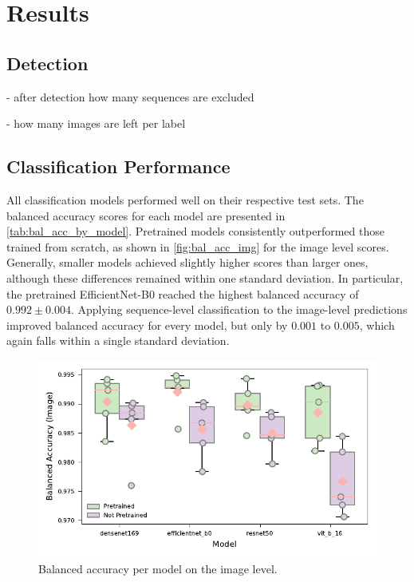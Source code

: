 

\section{Results}
\label{results}

    \subsection{Detection}

    - after detection how many sequences are excluded

    - how many images are left per label

    \subsection{Classification Performance}

    All classification models performed well on their respective test sets.
    The balanced accuracy scores for each model are presented in \autoref{tab:bal_acc_by_model}.
    Pretrained models consistently outperformed those trained from scratch, as shown in \autoref{fig:bal_acc_img} for the image level scores.
    Generally, smaller models achieved slightly higher scores than larger ones, although these differences remained within one standard deviation.
    In particular, the pretrained EfficientNet-B0 reached the highest balanced accuracy of \(0.992\pm0.004\).
    Applying sequence-level classification to the image-level predictions improved balanced accuracy for every model, but only by \(0.001\) to \(0.005\), which again falls within a single standard deviation.  


    


    \begin{figure}[ht]
    \centering
    \includegraphics{figures/bal_acc_img.pdf}
    \caption{Balanced accuracy per model on the image level.}
    \label{fig:bal_acc_img}
    \end{figure}

